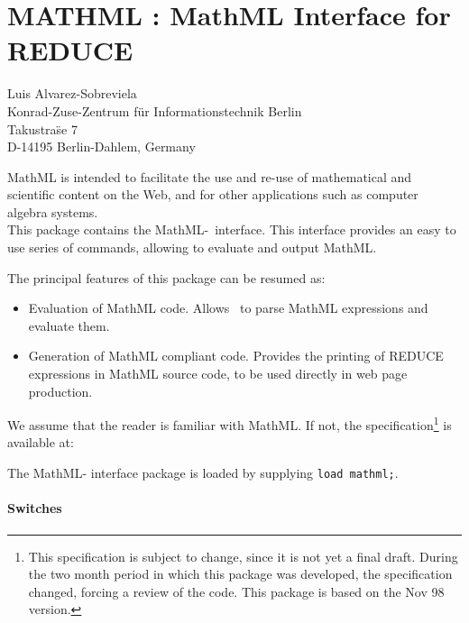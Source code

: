 \chapter{MATHML : MathML Interface for REDUCE }
\label{MATHML}


{\footnotesize
\begin{center}
Luis Alvarez-Sobreviela \\
Konrad-Zuse-Zentrum f\"ur Informationstechnik Berlin \\
Takustra\"se 7 \\
D-14195 Berlin-Dahlem, Germany \\
\end{center}
}

MathML is intended to facilitate the use and re-use of mathematical and
scientific content on the Web, and for other applications such as computer
algebra systems. \\
This package contains the MathML-{\REDUCE}\ interface.
This interface provides an easy to use series of commands, 
allowing to evaluate and output MathML.

The principal features of this package can be resumed as:  
\begin{itemize}
\item Evaluation of MathML code. Allows {\REDUCE}\  to parse MathML expressions
and evaluate them. 
\item Generation of MathML compliant code. Provides the printing of REDUCE
expressions in MathML source code, to be used directly in web page
production. 

\end{itemize}

We assume that the reader is familiar with MathML. If not, the
specification\footnote{This specification is subject to change, since it is
not yet a final draft. During the two month period in which this package was
developed, the specification changed, forcing a review of the code. This
package is based on the Nov 98 version.} 
is available at: 



The MathML-{\REDUCE} interface package is loaded by supplying {\tt load mathml;}.

\subsubsection{Switches}


